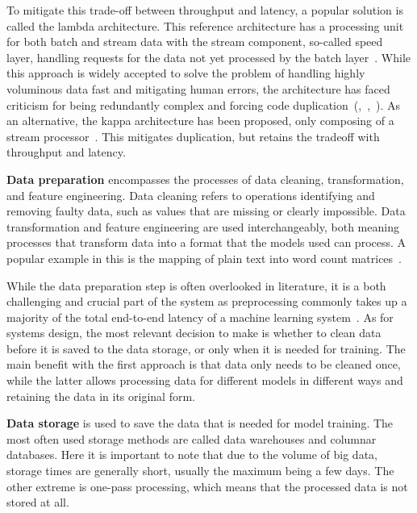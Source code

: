 To mitigate this trade-off between throughput and latency, a popular solution is called the lambda architecture. This reference architecture has a processing unit for both batch and stream data with the stream component, so-called speed layer, handling requests for the data not yet processed by the batch layer~\cite{beatingcap}. While this approach is widely accepted to solve the problem of handling highly voluminous data fast and mitigating human errors, the architecture has faced criticism for being redundantly complex and forcing code duplication~(\cite{questioninglambda},~\cite{uber},~\cite{facebook}). As an alternative, the kappa architecture has been proposed, only composing of a stream processor~\cite{questioninglambda}. This mitigates duplication, but retains the tradeoff with throughput and latency.

\textbf{Data preparation} encompasses the processes of data cleaning, transformation, and feature engineering. Data cleaning refers to operations identifying and removing faulty data, such as values that are missing or clearly impossible. Data transformation and feature engineering are used interchangeably, both meaning processes that transform data into a format that the models used can process. A popular example in this is the mapping of plain text into word count matrices~\cite{dapbook}.

While the data preparation step is often overlooked in literature,
it is a both challenging and crucial part of the system as preprocessing commonly takes up a majority of the total end-to-end latency of a machine learning system~\cite{adaptivelearningsystems}. As for systems design, the most relevant decision to make is whether to clean data before it is saved to the data storage, or only when it is  needed for training. The main benefit with the first approach is that data only needs to be cleaned once, while the latter allows processing data for different models in different ways and retaining the data in its original form.

\textbf{Data storage} is used to save the data that is needed for model training. The most often used storage methods are called data warehouses and columnar databases. Here it is important to note that due to the volume of big data, storage times are generally short, usually the maximum being a few days. The other extreme is one-pass processing, which means that the processed data is not stored at all.

